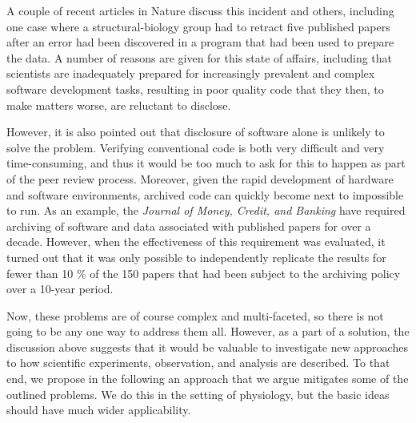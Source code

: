 A couple of recent articles in Nature \cite{Merali2010, Barnes2010} discuss this incident 
and others, including one case where a structural-biology group had to
retract five published papers after an error had been discovered in a program
that had been used to prepare the data. A number of reasons are given for
this state of affairs, including that scientists are inadequately prepared for
increasingly prevalent and complex software development tasks, resulting
in poor quality code that they then, to make matters worse, are reluctant to
disclose.

However, it is also pointed out that disclosure of software alone is unlikely
to solve the problem. Verifying conventional code is both very difficult and
very time-consuming, and thus it would be too much to ask for this to happen
as part of the peer review process. Moreover, given the rapid development of
hardware and software environments, archived code can quickly become next to
impossible to run. As an example, the \textit{Journal of Money, Credit, and
Banking} have required archiving of software and data associated with
published papers for over a decade. However, when the effectiveness of this
requirement was evaluated, it turned out that it was only possible to
independently replicate the results for fewer than 10 \% of the 150 papers
that had been subject to the archiving policy over a 10-year period.

Now, these problems are of course complex and multi-faceted, so there is not
going to be any one way to address them all. However, as a part of a solution,
the discussion above suggests that it would be valuable to investigate new
approaches to how scientific experiments, observation, and analysis are
described. To that end, we propose in the following an approach that we argue
mitigates some of the outlined problems. We do this in the setting of
physiology, but the basic ideas should have much wider applicability.

